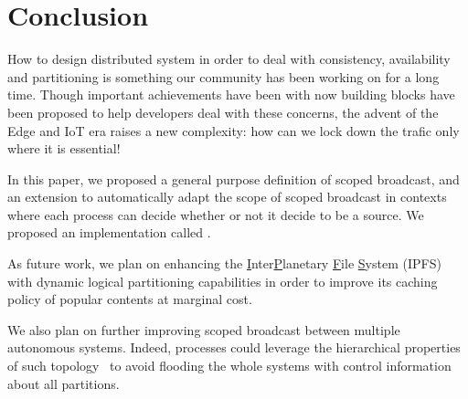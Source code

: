 
\section{Conclusion}
\label{sec:conclusion}

How to design distributed system in order to deal with consistency,
availability and partitioning is something our community has been
working on for a long time.  Though important achievements have been
with now building blocks have been proposed to help developers deal
with these concerns, the advent of the Edge and IoT era raises a new
complexity: how can we lock down the trafic only where it is
essential!

In this paper, we proposed a general purpose definition of scoped
broadcast, and an extension to automatically adapt the scope of scoped
broadcast in contexts where each process can decide whether or not it
decide to be a source. We proposed an implementation called \NAME.

As future work, we plan on enhancing the
\underline{I}nter\underline{P}lanetary \underline{F}ile
\underline{S}ystem (IPFS)~\cite{henningsen2020mapping} with dynamic
logical partitioning capabilities in order to improve its caching
policy of popular contents at marginal cost.


\noindent We also plan on further improving scoped broadcast between
multiple autonomous systems. Indeed, processes could leverage the
hierarchical properties of such topology~\cite{nur2018geography} to
avoid flooding the whole systems with control information about all
partitions.



